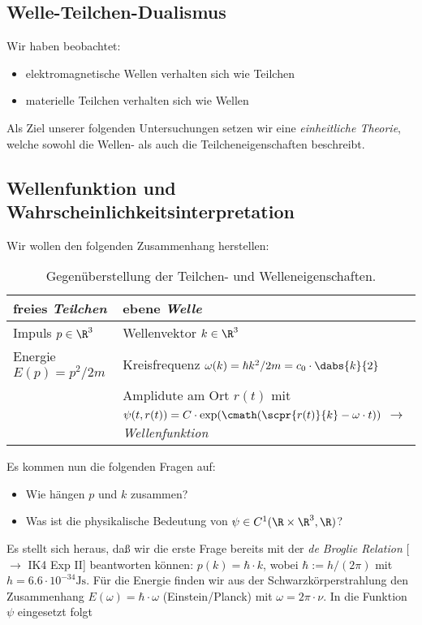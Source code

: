 \documentclass{article}
\begin{document}
    \subsection*{Welle-Teilchen-Dualismus}
        Wir haben beobachtet:
        \begin{itemize}[label=$\to$]
            \item elektromagnetische Wellen verhalten sich wie Teilchen
            \item materielle Teilchen verhalten sich wie Wellen
        \end{itemize}
        Als Ziel unserer folgenden Untersuchungen setzen wir eine \emph{einheitliche Theorie}, welche sowohl die Wellen- als auch die Teilcheneigenschaften beschreibt. 

    \subsection*{Wellenfunktion und Wahrscheinlichkeitsinterpretation}
        Wir wollen den folgenden Zusammenhang herstellen:
        \begin{table}[H]
            \centering
            \begin{tabular}{p{5cm}|p{6cm}}
                freies \emph{Teilchen} & ebene \emph{Welle} \\
                \hline
                Impuls $p\in\R^3$ & Wellenvektor $k\in\R^3$ \\
                Energie $E(p) = p^2/2m$ & Kreisfrequenz $\omega(k) = \hbar k^2/2m = c_0\cdot\dabs{k}{2}$ \\
                 & Amplidute am Ort $r(t)$ mit $\psi(t,r(t)) = C\cdot\exp(\cmath(\scpr{r(t)}{k} - \omega\cdot t))$ $\to$ \emph{Wellenfunktion}
            \end{tabular}
            \caption{Gegenüberstellung der Teilchen- und Welleneigenschaften.}
        \end{table}
        \noindent Es kommen nun die folgenden Fragen auf:
        \begin{itemize}[label=$\to$]
            \item Wie hängen $p$ und $k$ zusammen? 
            \item Was ist die physikalische Bedeutung von $\psi\in C^1(\R\times\R^3,\R)$?
        \end{itemize}
        Es stellt sich heraus, daß wir die erste Frage bereits mit der \emph{de Broglie Relation} [$\to$ IK4 Exp II] beantworten können: $p(k) = \hbar\cdot k$, wobei $\hbar:=h/(2\pi)$ mit $h = 6.6\cdot 10^{-34}\si{\joule\second}$. Für die Energie finden wir aus der Schwarzkörperstrahlung den Zusammenhang $E(\omega) = \hbar\cdot\omega$ (Einstein/Planck) mit $\omega = 2\pi\cdot\nu$. In die Funktion $\psi$ eingesetzt folgt
\end{document}
